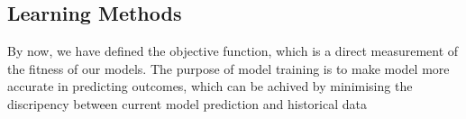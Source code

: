 \subsection {Learning Methods}
By now, we have defined the objective function, which is a direct measurement of the fitness of our models. The purpose of model training is to make model more accurate in predicting outcomes, which can be achived by minimising the discripency between current model prediction and historical data
